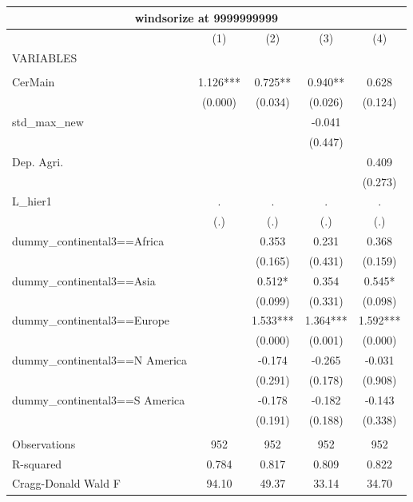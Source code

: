 \documentclass[12pt,a4paper]{article}
\begin{document}
\begin{tabular}{lcccc}
\multicolumn{5}{c}{windsorize at 9999999999} \\ \hline
 & (1) & (2) & (3) & (4) \\
VARIABLES &  &  &  &  \\ \hline
 &  &  &  &  \\
CerMain & 1.126*** & 0.725** & 0.940** & 0.628 \\
 & (0.000) & (0.034) & (0.026) & (0.124) \\
std\_max\_new &  &  & -0.041 &  \\
 &  &  & (0.447) &  \\
Dep. Agri. &  &  &  & 0.409 \\
 &  &  &  & (0.273) \\
L\_hier1 & . & . & . & . \\
 & (.) & (.) & (.) & (.) \\
dummy\_continental3==Africa &  & 0.353 & 0.231 & 0.368 \\
 &  & (0.165) & (0.431) & (0.159) \\
dummy\_continental3==Asia &  & 0.512* & 0.354 & 0.545* \\
 &  & (0.099) & (0.331) & (0.098) \\
dummy\_continental3==Europe &  & 1.533*** & 1.364*** & 1.592*** \\
 &  & (0.000) & (0.001) & (0.000) \\
dummy\_continental3==N America &  & -0.174 & -0.265 & -0.031 \\
 &  & (0.291) & (0.178) & (0.908) \\
dummy\_continental3==S America &  & -0.178 & -0.182 & -0.143 \\
 &  & (0.191) & (0.188) & (0.338) \\
 &  &  &  &  \\
Observations & 952 & 952 & 952 & 952 \\
R-squared & 0.784 & 0.817 & 0.809 & 0.822 \\
 Cragg-Donald Wald F & 94.10 & 49.37 & 33.14 & 34.70 \\ \hline
\end{tabular}
\end{document}

